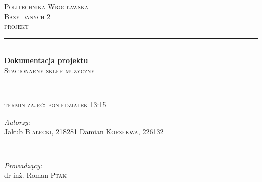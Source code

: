 
\setlength{\parskip}{1ex plus 0.5ex minus 0.5ex}



\begin{titlepage}

\newcommand{\HRule}{\rule{\linewidth}{0.5mm}} %

\center %
 

\textsc{\large Politechnika Wrocławska}\\[4cm] %
\textsc{\Large Bazy danych 2}\\[0.5cm] %
\textsc{\large projekt}\\[0.5cm] %


\HRule \\[0.6cm]
{\huge \bfseries Dokumentacja projektu}\\[0.4cm] %
\textsc{\Large Stacjonarny sklep muzyczny}\\[0.4cm]
\HRule \\[0.5cm]
 

{\textsc{\large termin zajęć: poniedziałek 13:15}}\\[1.0cm]

\begin{minipage}{0.4\textwidth}
	\begin{flushleft} \large
		\emph{Autorzy:}\\[0.1cm]
		Jakub \textsc{Białecki}, 218281
		\newline
		Damian \textsc{Korzekwa}, 226132
	\end{flushleft}
\end{minipage}
~
\begin{minipage}{0.5\textwidth}
	\begin{flushright} \large
		\emph{Prowadzący:} \\[0.1cm]
		dr inż. Roman \textsc{Ptak}
	\end{flushright}
\end{minipage}\\[1cm]


\end{titlepage}
